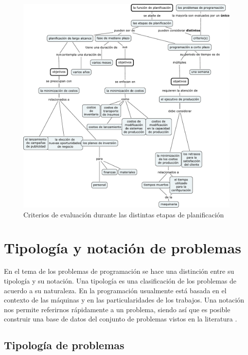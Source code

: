 \documentclass[spanish,draft,12pt,headsepline,footsepline,paper=letter]{scrreprt}
\begin{document}
\begin{figure}[hbtp]
\centering
\includegraphics[height=.90\textheight]{media/criterios_evaluacion.pdf}
\caption[Criterios de evaluación]{Criterios de evaluación durante las distintas etapas de planificación}
\label{fig:criterios_evaluacion}
\end{figure}

\section{Tipología y notación de problemas}

En el tema de los problemas de programación se hace una distinción entre su tipología y su notación. Una tipología es una clasificación de los problemas de acuerdo a su naturaleza. En la programación usualmente está basada en el contexto de las máquinas y en las particularidades de los trabajos. Una notación nos permite referirnos rápidamente a un problema, siendo así que es posible construir una base de datos del conjunto de problemas vistos en la literatura \citep[p.~14]{TKindt2002}.

\subsection{Tipología de problemas}
\end{document}
